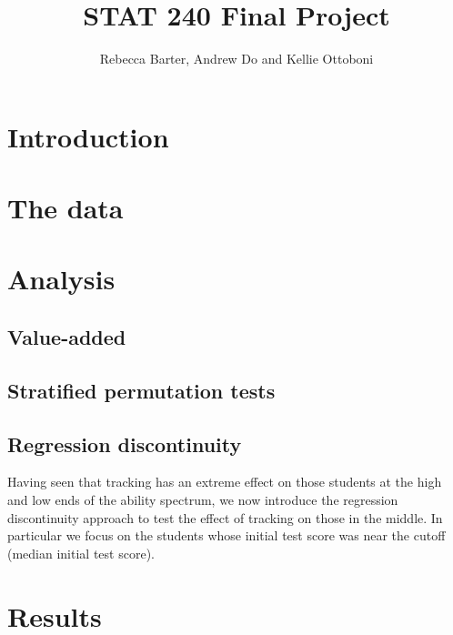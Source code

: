 \documentclass[11pt]{article}
\title{STAT 240 Final Project}
\author{Rebecca Barter, Andrew Do and Kellie Ottoboni}
\begin{document}
\maketitle

 \section{Introduction}
 
 
 \section{The data}
 
 
 
 \section{Analysis}
 \subsection{Value-added}
 
 \subsection{Stratified permutation tests}
 
 
 \subsection{Regression discontinuity}
Having seen that tracking has an extreme effect on those students at the high and low ends of the ability spectrum, we now introduce the regression discontinuity approach to test the effect of tracking on those in the middle. In particular we focus on the students whose initial test score was near the cutoff (median initial test score). 
 
 
 \section{Results}
 
\end{document}
